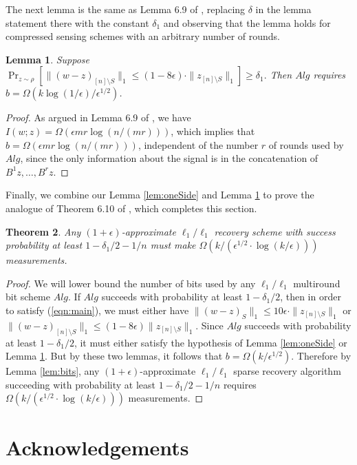 \documentclass[twoside,leqno,twocolumn]{article}
\newtheorem{theorem}{Theorem}[section]
\newtheorem{lemma}[theorem]{Lemma}
\def\eps{\epsilon}
\begin{document}
The next lemma is the same as Lemma 6.9 of \cite{PW11}, replacing
$\delta$ in the lemma statement there with the constant $\delta_1$ and
observing that the lemma holds for compressed sensing schemes with an
arbitrary number of rounds. \begin{lemma}\label{lem:noise}
  Suppose $\Pr_{z \sim \rho}[\|(w-z)_{[n] \setminus S}\|_1 \leq
  (1-8\eps) \cdot \|z_{[n] \setminus S}\|_1] \geq \delta_1.$  Then
  $Alg$ requires $b = \Omega(k \log(1/\eps) / \eps^{1/2})$.
\end{lemma}
\begin{proof}
  As argued in Lemma 6.9 of \cite{PW11}, we have $I(w ; z)
  = \Omega(\eps mr \log(n/(mr)))$, which implies that $b = \Omega(\eps
  mr \log(n/(mr)))$, independent of the number $r$ of rounds used by
  $Alg$, since the only information about the signal is in the concatenation
  of $B^1z, \ldots, B^rz$. 
\end{proof}
Finally, we combine our Lemma \ref{lem:oneSide} and Lemma
\ref{lem:noise} to prove the analogue of Theorem 6.10 of \cite{PW11},
which completes this section. \begin{theorem}\label{thm:conclusion}
  Any $(1+\eps)$-approximate $\ell_1/\ell_1$ recovery scheme with
  success probability at least $1-\delta_1/2-1/n$ must make
  $\Omega(k/(\eps^{1/2} \cdot \log (k/\eps)))$ measurements.
\end{theorem}
\begin{proof}
  We will lower bound the number of bits used by any $\ell_1/\ell_1$ multiround bit scheme
  $Alg$. If $Alg$ succeeds with probability at least $1-\delta_1/2$,
  then in order to satisfy (\ref{eqn:main}), we must either have
  $\|(w-z)_S\|_1 \leq 10\eps \cdot \|z_{[n] \setminus S}\|_1$ or
  $\|(w-z)_{[n] \setminus S}\|_1 \leq (1-8\eps)\|z_{[n] \setminus
    S}\|_1$. Since $Alg$ succeeds with probability at least
  $1-\delta_1/2$, it must either satisfy the hypothesis of Lemma
  \ref{lem:oneSide} or Lemma \ref{lem:noise}. But by these two lemmas,
  it follows that $b = \Omega(k/\eps^{1/2})$. Therefore by Lemma
  \ref{lem:bits}, any $(1+\eps)$-approximate $\ell_1/\ell_1$ sparse
  recovery algorithm succeeding with probability at least $1-\delta_1/2
  - 1/n$ requires $\Omega(k/(\eps^{1/2} \cdot \log(k/\eps)))$
  measurements.
\end{proof}

\section{Acknowledgements}
\end{document}

